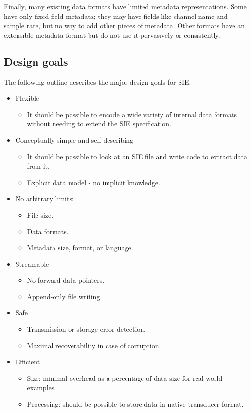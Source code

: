 \documentclass{article}
\begin{document}
Finally, many existing data formats have limited metadata
representations.  Some have only fixed-field metadata; they may have
fields like channel name and sample rate, but no way to add other
pieces of metadata.  Other formats have an extensible metadata format
but do not use it pervasively or consistently.

\subsection{Design goals}

The following outline describes the major design goals for SIE:

\begin{itemize}
\item Flexible
  \begin{itemize}
  \item It should be possible to encode a wide variety of internal
    data formats without needing to extend the SIE specification.
  \end{itemize}
\item Conceptually simple and self-describing
  \begin{itemize}
  \item It should be possible to look at an SIE file and write code
    to extract data from it.
  \item Explicit data model - no implicit knowledge.
  \end{itemize}
\item No arbitrary limits:
  \begin{itemize}
  \item File size.
  \item Data formats.
  \item Metadata size, format, or language.
  \end{itemize}
\end{itemize}

\begin{itemize}
\item Streamable
  \begin{itemize}
  \item No forward data pointers.
  \item Append-only file writing.
  \end{itemize}
\item Safe
  \begin{itemize}
  \item Transmission or storage error detection.
  \item Maximal recoverability in case of corruption.
  \end{itemize}
\item Efficient
  \begin{itemize}
  \item Size:  minimal overhead as a percentage of data size for
    real-world examples.
  \item Processing:  should be possible to store data in native
    transducer format.
  \end{itemize}
\end{itemize}
\end{document}
